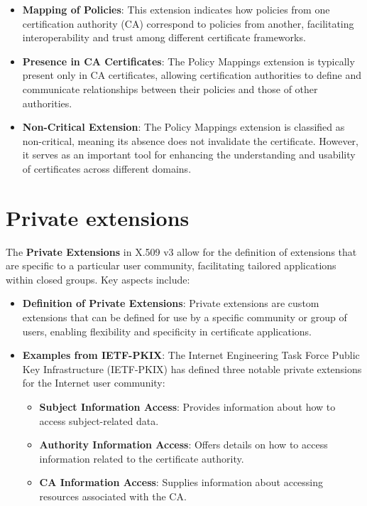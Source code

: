 \begin{itemize}
  \item \textbf{Mapping of Policies}: This extension indicates how
    policies from one certification authority (CA) correspond to
    policies from another, facilitating interoperability and trust
    among different certificate frameworks.

  \item \textbf{Presence in CA Certificates}: The Policy Mappings
    extension is typically present only in CA certificates, allowing
    certification authorities to define and communicate
    relationships between their policies and those of other
    authorities.

  \item \textbf{Non-Critical Extension}: The Policy Mappings
    extension is classified as non-critical, meaning its absence
    does not invalidate the certificate. However, it serves as an
    important tool for enhancing the understanding and usability of
    certificates across different domains.
\end{itemize}

\section{Private extensions}

The \textbf{Private Extensions} in X.509 v3 allow for the definition
of extensions that are specific to a particular user community,
facilitating tailored applications within closed groups. Key aspects
include:

\begin{itemize}
  \item \textbf{Definition of Private Extensions}: Private
    extensions are custom extensions that can be defined for use by
    a specific community or group of users, enabling flexibility and
    specificity in certificate applications.

  \item \textbf{Examples from IETF-PKIX}: The Internet Engineering
    Task Force Public Key Infrastructure (IETF-PKIX) has defined
    three notable private extensions for the Internet user
    community:
    \begin{itemize}
      \item \textbf{Subject Information Access}: Provides
        information about how to access subject-related data.
      \item \textbf{Authority Information Access}: Offers details on
        how to access information related to the certificate
        authority.
      \item \textbf{CA Information Access}: Supplies information
        about accessing resources associated with the CA.
    \end{itemize}
\end{itemize}

